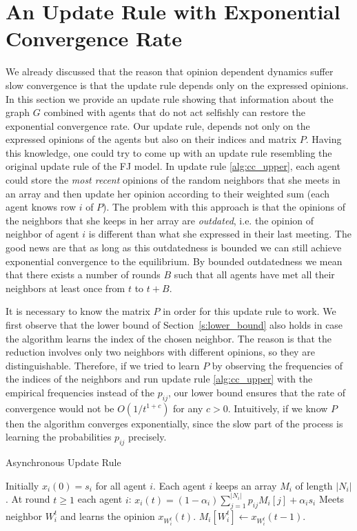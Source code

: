 \section{An Update Rule with Exponential Convergence Rate}\label{s:cc_convergence}

We already discussed that the reason that opinion dependent dynamics suffer slow
convergence is that the update rule depends only on the expressed opinions.
In this section we provide an update rule showing that information about the
graph $G$ combined with agents that do not act selfishly can restore the
exponential convergence rate.
Our update rule, depends not only on the expressed opinions of the
agents but also on their indices and matrix $P$.
Having this knowledge, one could try to come up with an
update rule resembling the original update rule of the FJ model.
In update rule \ref{alg:cc_upper}, each agent could store the
\emph{most recent} opinions of the random neighbors that she meets in an array
and then update her
opinion according to their weighted sum (each agent knows row $i$ of $P$).
The problem with this approach is that the opinions of the neighbors
that she keeps in her array are \emph{outdated}, i.e. the opinion of
neighbor of agent $i$ is different than what she expressed in their
last meeting.  The good news are that as long as this outdatedness
is bounded we can still achieve exponential convergence to the
equilibrium.  By bounded outdatedness we mean that there exists a
number of rounds $B$ such that all agents have met all their neighbors
at least once from $t$ to $t+B$.
\begin{remark}
It is necessary to know the matrix $P$ in order for this
update rule to work. We first observe that the lower bound of
Section~\ref{s:lower_bound} also holds in case the algorithm learns the index
of the chosen neighbor. The reason is that the reduction involves only two neighbors
with different opinions, so they are distinguishable.
Therefore, if we tried to learn $P$ by observing the frequencies
of the indices of the neighbors and run update rule \ref{alg:cc_upper}
with the empirical frequencies instead of the $p_{ij}$, our lower bound
ensures that the rate of convergence would not be $O(1/t^{1+c})$ for any $c>0$.
Intuitively, if we know $P$ then the algorithm converges exponentially,
since the slow part of the process is learning the probabilities $p_{ij}$
precisely.
\end{remark}
\vspace{-5mm}
\begin{algorithm}
  \caption{Asynchronous Update Rule}
  \label{alg:cc_upper}
  \begin{algorithmic}[1]
    \STATE Initially $x_i(0) = s_i$ for all agent $i$.
    \STATE Each agent $i$ keeps an array $M_i$ of length $|N_i|$.
    \STATE At round $t\geq 1$ each agent $i$:
    \bindent
    \STATE $x_i(t) = (1-\alpha_i)\sum_{j=1}^{|N_i|} p_{ij} M_i[j] + \alpha_is_i$
    \STATE Meets neighbor $W_i^t$ and learns the opinion $x_{W_i^t}(t)$.
    \STATE $M_i[W_i^t] \gets x_{W_i^t}(t-1)$.
    \eindent
  \end{algorithmic}
\end{algorithm}

